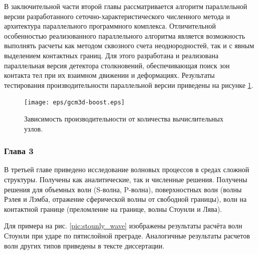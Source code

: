 В заключительной части второй главы рассматривается алгоритм параллельной версии разработанного сеточно-характеристического численного метода и архитектура параллельного программного комплекса. Отличительной особенностью реализованного параллельного алгоритма является возможность выполнять расчеты как методом сквозного счета неоднородностей, так и с явным выделением контактных границ. Для этого разработана и реализована параллельная версия детектора столкновений, обеспечивающая поиск зон контакта тел при их взаимном движении и деформациях. Результаты тестирования производительности параллельной версии приведены на рисунке \ref{pic:gcm_boost}.
\begin{figure}[htp]
\centering
\texttt{[image: eps/gcm3d-boost.eps]}
\caption{Зависимость производительности от количества вычислительных узлов.}
\label{pic:gcm_boost}
\end{figure}


\subsubsection*{Глава 3}

В третьей главе приведено исследование волновых процессов в средах сложной структуры. Получены как аналитические, так и численные решения. Получены решения для объемных волн (S-волна, P-волна), поверхностных волн (волны Рэлея и Лэмба, отражение сферической волны от свободной границы), волн на контактной границе (преломление на границе, волны Стоунли и Лява).

Для примера на рис. \ref{pic:stounly_wave} изображены результаты расчёта волн Стоунли при ударе по пятислойной преграде. Аналогичные результаты расчетов волн других типов приведены в тексте диссертации.

